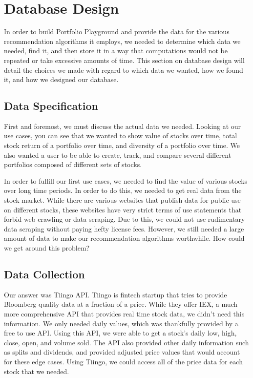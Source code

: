 \documentclass{article}
\begin{document}
\section{Database Design} \label{sec:db}
In order to build Portfolio Playground and provide the data for the various recommendation algorithms it employs, we needed to determine which data we needed, find it, and then store it in a way that computations would not be repeated or take excessive amounts of time.  This section on database design will detail the choices we made with regard to which data we wanted, how we found it, and how we designed our database.

\subsection{Data Specification}
First and foremost, we must discuss the actual data we needed.  Looking at our use cases, you can see that we wanted to show value of stocks over time, total stock return of a portfolio over time, and diversity of a portfolio over time.  We also wanted a user to be able to create, track, and compare several different portfolios composed of different sets of stocks.  

In order to fulfill our first use cases, we needed to find the value of various stocks over long time periods.  In order to do this, we needed to get real data from the stock market.  While there are various websites that publish data for public use on different stocks, these websites have very strict terms of use statements that forbid web crawling or data scraping.  Due to this, we could not use rudimentary data scraping without paying hefty license fees.  However, we still needed a large amount of data to make our recommendation algorithms worthwhile.  How could we get around this problem?

\subsection{Data Collection}
Our answer was Tiingo API.  Tiingo is fintech startup that tries to provide Bloomberg quality data at a fraction of a price.  While they offer IEX, a much more comprehensive API that provides real time stock data, we didn’t need this information.  We only needed daily values, which was thankfully provided by a free to use API.  Using this API, we were able to get a stock’s daily low, high, close, open, and volume sold. The API also provided other daily information such as splits and dividends, and provided adjusted price values that would account for these edge cases. Using Tiingo, we could access all of the price data for each stock that we needed.
\end{document}
